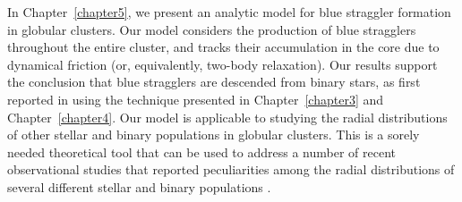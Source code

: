 %
In Chapter~\ref{chapter5}, we present an analytic model for blue
straggler formation in globular clusters.  Our model considers the
production of blue stragglers throughout the entire cluster, and
tracks their accumulation in the core due to dynamical friction (or,
equivalently, two-body relaxation).  Our results support the
conclusion that blue stragglers are descended from binary stars, as
first reported in \citet{knigge09} using the technique presented in
Chapter~\ref{chapter3} and Chapter~\ref{chapter4}.  Our model is applicable to
studying the radial distributions of other stellar and binary
populations in globular clusters.  This is a sorely needed theoretical
tool that can be used to address a number of recent observational 
studies that reported peculiarities among the radial distributions of
several different stellar and binary populations
\citep[e.g.][]{rood73, fusipecci93, ferraro04, lanzoni07}.

